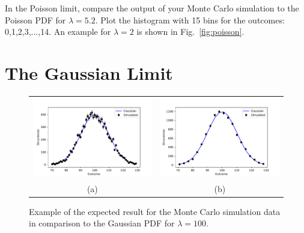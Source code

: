\begin{plot} In the Poisson limit, compare the output of your Monte Carlo simulation to the Poisson PDF
for $\lambda=5.2$.
Plot the histogram with 15 bins for the outcomes: 0,1,2,3,...,14.  
An example for $\lambda=2$ is shown in Fig.~\ref{fig:poisson}.
\end{plot}


\section{The Gaussian Limit}

\begin{figure}[htbp]
\begin{center}
\begin{tabular}{cc}
\includegraphics[height=0.22\textheight]{figs/labs/distributions/gauss_finebins.pdf} &
\includegraphics[height=0.22\textheight]{figs/labs/distributions/gauss.pdf} \\
(a) & (b) \\
\end{tabular}
\end{center}
\caption{\label{fig:gauss} Example of the expected result for the Monte Carlo simulation data in comparison to the Gaussian PDF for $\lambda=100$. }
\end{figure}

